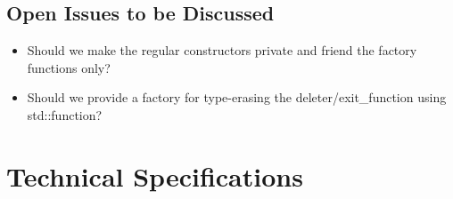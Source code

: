 \documentclass[ebook,11pt,article]{memoir}
\begin{document}
\section{Open Issues to be Discussed}
\begin{itemize}
\item Should we make the regular constructors private and friend the factory functions only?
\item Should we provide a factory for type-erasing the deleter/exit_function using std::function?
\end{itemize}


\chapter{Technical Specifications}
\end{document}
